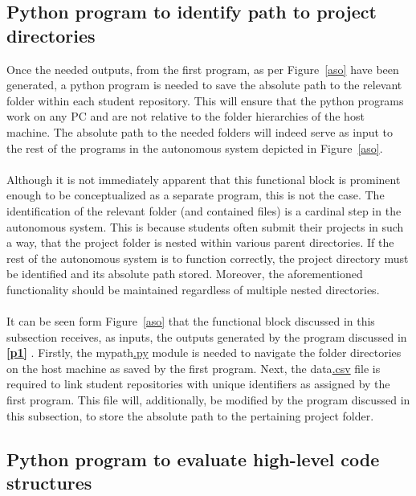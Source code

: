 \subsection{Python program to identify path to project directories}
\label{p2}
Once the needed outputs, from the first program, as per Figure~\ref{aso} have been generated, a python program is needed to save the absolute path to the relevant folder within each student repository. This will ensure that the python programs work on any PC and are not relative to the folder hierarchies of the host machine. The absolute path to the needed folders will indeed serve as input to the rest of the programs in the autonomous system depicted in Figure~\ref{aso}.
\\\\
Although it is not immediately apparent that this functional block is prominent enough to be conceptualized as a separate program, this is not the case. The identification of the relevant folder (and contained files) is a cardinal step in the autonomous system. This is because students often submit their projects in such a way, that the project folder is nested within various parent directories. If the rest of the autonomous system is to function correctly, the project directory must be identified and its absolute path stored. Moreover, the aforementioned functionality should be maintained regardless of multiple nested directories.
\\\\
It can be seen form Figure~\ref{aso} that the functional block discussed in this subsection receives, as inputs, the outputs generated by the program discussed in \textbf{\ref{p1} }. Firstly, the mypath\hyperref[listExt]{.py} module is needed to navigate the folder directories on the host machine as saved by the first program. Next, the data\hyperref[listExt]{.csv} file is required to link student repositories with unique identifiers as assigned by the first program. This file will, additionally, be modified by the program discussed in this subsection, to store the absolute path to the pertaining project folder.  

\subsection{Python program to evaluate high-level code structures}
\label{p3}

